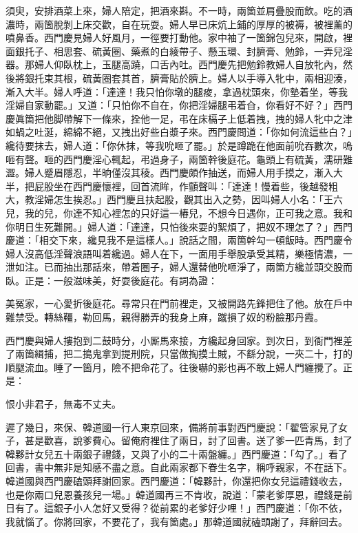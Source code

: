 須臾，安排酒菜上來，婦人陪定，把酒來斟。不一時，兩箇並肩疊股而飲。吃的酒濃時，兩箇脫剝上床交歡，自在玩耍。婦人早已床炕上鋪的厚厚的被褥，被裡薰的噴鼻香。西門慶見婦人好風月，一徑要打動他。家中袖了一箇錦包兒來，開啟，裡面銀托子、相思套、硫黃圈、藥煮的白綾帶子、懸玉環、封臍膏、勉鈴，一弄兒淫器。那婦人仰臥枕上，玉腿高蹺，口舌內吐。西門慶先把勉鈴教婦人自放牝內，然後將銀托束其根，硫黃圈套其首，臍膏貼於臍上。婦人以手導入牝中，兩相迎湊，漸入大半。婦人呼道：「達達！我只怕你墩的腿痠，拿過枕頭來，你墊着坐，等我淫婦自家動罷。」{}又道：「只怕你不自在，你把淫婦腿弔着㒲，你看好不好？」西門慶眞箇把他脚帶解下一條來，拴他一足，弔在床槅子上低着拽，拽的婦人牝中之津如蝸之吐涎，綿綿不絕，又拽出好些白漿子來。西門慶問道：「你如何流這些白？」纔待要抹去，婦人道：「你休抹，等我吮咂了罷。」於是蹲跪在他面前吮吞數次，嗚咂有聲。咂的西門慶淫心輒起，弔過身子，兩箇幹後庭花。龜頭上有硫黃，濡研難澀。婦人蹙眉隱忍，半晌僅沒其稜。西門慶頗作抽送，而婦人用手摸之，漸入大半，把屁股坐在西門慶懷裡，回首流眸，作顫聲叫：「達達！慢着些，後越發粗大，教淫婦怎生挨忍。」西門慶且扶起股，觀其出入之勢，因叫婦人小名：「王六兒，我的兒，你達不知心裡怎的只好這一樁兒，不想今日遇你，正可我之意。我和你明日生死難開。」婦人道：「達達，只怕後來耍的絮煩了，把奴不理怎了？」西門慶道：「相交下來，纔見我不是這樣人。」說話之間，兩箇幹勾一頓飯時。西門慶令婦人沒高低淫聲浪語叫着纔過。婦人在下，一面用手舉股承受其精，樂極情濃，一泄如注。已而抽出那話來，帶着圈子，婦人還替他吮咂淨了，兩箇方纔並頭交股而臥。正是：一般滋味美，好耍後庭花。有詞為證：

\begin{myquote}
美冤家，一心愛折後庭花。尋常只在門前裡走，又被開路先鋒把住了他。放在戶中難禁受。轉絲韁，勒回馬，親得勝弄的我身上麻，蹴損了奴的粉臉那丹霞。
\end{myquote}

西門慶與婦人摟抱到二鼓時分，小厮馬來接，方纔起身回家。到次日，到衙門裡差了兩箇緝捕，把二搗鬼拿到提刑院，只當做掏摸土賊，不繇分說，一夾二十，打的順腿流血。睡了一箇月，險不把命花了。往後嚇的影也再不敢上婦人門纏攪了。正是：

\begin{myquote}
恨小非君子，無毒不丈夫。
\end{myquote}

遲了幾日，來保、韓道國一行人東京回來，備將前事對西門慶說：「翟管家見了女子，甚是歡喜，說爹費心。留俺府裡住了兩日，討了回書。送了爹一匹青馬，封了韓夥計女兒五十兩銀子禮錢，又與了小的二十兩盤纏。」西門慶道：「勾了。」看了回書，書中無非是知感不盡之意。自此兩家都下眷生名字，稱呼親家，{}不在話下。韓道國與西門慶磕頭拜謝回家。西門慶道：「韓夥計，你還把你女兒這禮錢收去，也是你兩口兒恩養孩兒一場。」韓道國再三不肯收，說道：「蒙老爹厚恩，禮錢是前日有了。這銀子小人怎好又受得？從前累的老爹好少哩！」西門慶道：「你不依，我就惱了。你將回家，不要花了，我有箇處。」那韓道國就磕頭謝了，拜辭回去。

